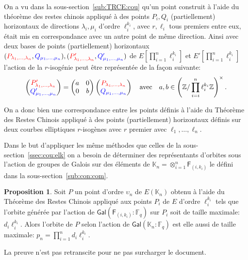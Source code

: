 \documentclass[10pt,a4paper]{book}
\theoremstyle{plain}
\theoremstyle{definition}
\theoremstyle{definition}
\theoremstyle{definition}
\newtheorem{prop}[thm]{Proposition}
\theoremstyle{definition}
\theoremstyle{remark}
\theoremstyle{remark}
\theoremstyle{definition}
\begin{document}
\label{sss:crt:cou}
On a vu dans la sous-section~\ref{sub:TRCE:cou} 
qu'un point construit à l'aide du théorème des restes chinois appliqué à des 
points $P_i,Q_i$ (partiellement) horizontaux de directions $\lambda_i,\mu_i$  
d'ordre $\ell_i^{k_i}$, avec $r, \ell_i$ tous premiers entre eux, 
était mis en correspondance avec un autre point de même direction.
Ainsi avec deux bases de points (partiellement) horizontaux $(\color{red}P_{\lambda_1,
 \dots, \lambda_n}\color{black},\color{blue}Q_{\mu_1, \dots, 
 \mu_n}\color{black}),(\color{red}P'_{\lambda_1, \dots, \lambda_n}\color{black}
 ,\color{blue}
 Q'_{\mu_1, \dots, \mu_n}\color{black})$ de $E[\prod_{i=1}^n\ell_i^{k_i}]$ et 
 $E'[\prod_{i=1}^n\ell_i^{k_i}]$ l'action de la $r$-isogénie peut être 
 représentée de la façon suivante:  
 \begin{equation*}
\left(
\begin{matrix}
\color{red} P'_{\lambda_1,
 \dots, \lambda_n} \\
\color{blue} Q'_{\mu_1, \dots, 
 \mu_n} \color{black}
\end{matrix}
\right)= \left(\begin{matrix}
a & 0 \\
0 & b
\end{matrix} \right)
\left(
\begin{matrix}
\color{red} P_{\lambda_1, 
\dots, \lambda_n} \\
\color{blue} Q_{\mu_1, \dots, 
 \mu_n} \color{black}
\end{matrix}
\right)
\quad \text{avec} \quad a,b \in \left( \mathbb{Z}/\prod_{i=i}^n\ell_i^{k_i}\mathbb{Z} \right)^{\times}.
\end{equation*}

On a donc bien une correspondance entre les points définis à l'aide du Théorème
 des Restes Chinois appliqué à des points (partiellement) horizontaux définis 
 sur deux courbes elliptiques $r$-isogènes avec $r$ premier avec $\ell_1, \dots
 , \ell_n$.
 
Dans le but d'appliquer les même méthodes que celles de la 
sous-section~\ref{ssec:cou:elk} on a besoin de déterminer des représentants 
d'orbites sous l'action de groupes de Galois sur des éléments de 
$\mathbb{K}_n=\otimes_{i=1}^{n}\mathsf{F}_{(i,k_i)}$ le
défini dans la sous-section~\ref{sub:con:com}.
\begin{prop}
\label{pro:rep:com}
Soit $P$ un point d'ordre $\upsilon_n$  de $E(\mathbb{K}_n)$ obtenu à l'aide 
du Théorème des Restes Chinois appliqué aux points $P_i$ de $E$ d'ordre 
$\ell_i^{k_i}$ tels que l'orbite générée par l'action de 
$\mathsf{Gal}(\mathsf{F}_{(i,k_i)}:\mathbb{F}_q)$ sur $P_i$ soit de taille
 maximale: $d_i\ell_i^{k_i}$.  Alors l'orbite de $P$ selon l'action de 
 $\mathsf{Gal}(\mathbb{K}_n:\mathbb{F}_q)$ est elle aussi de taille maximale:
 $p_n=\prod_{i=1}^nd_i\ell_i^{k_i}$.
\end{prop} 
La preuve n'est pas retranscite pour ne pas surcharger le document.
\end{document}
